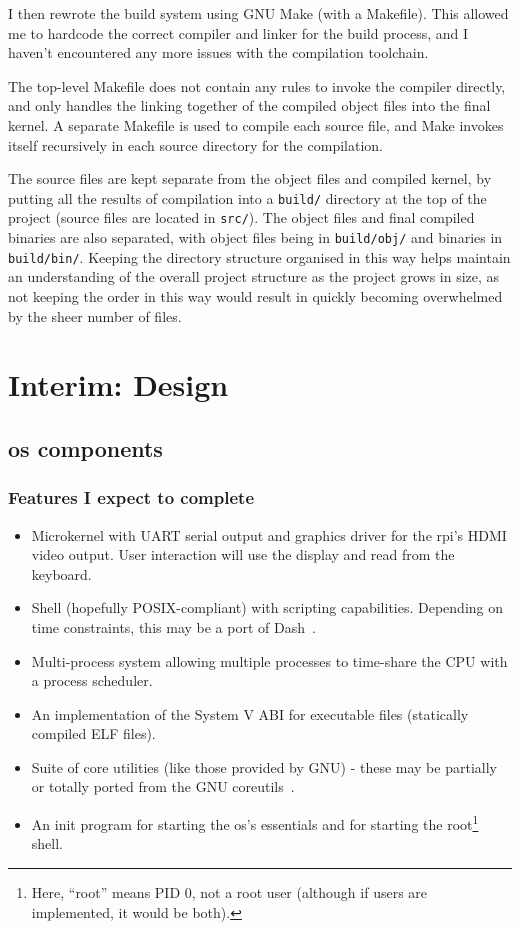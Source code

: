 \documentclass{article}
\begin{document}
I then rewrote the build system using GNU Make (with a Makefile). This allowed
me to hardcode the correct compiler and linker for the build process, and I
haven't encountered any more issues with the compilation toolchain.

The top-level Makefile does not contain any rules to invoke the compiler
directly, and only handles the linking together of the compiled object files
into the final kernel. A separate Makefile is used to compile each source file,
and Make invokes itself recursively in each source directory for the
compilation.

The source files are kept separate from the object files and compiled kernel,
by putting all the results of compilation into a \texttt{build/} directory at
the top of the project (source files are located in \texttt{src/}). The object
files and final compiled binaries are also separated, with object files being
in \texttt{build/obj/} and binaries in \texttt{build/bin/}. Keeping the
directory structure organised in this way helps maintain an understanding of
the overall project structure as the project grows in size, as not keeping the
order in this way would result in quickly becoming overwhelmed by the sheer
number of files.

\section{Interim: Design}
\subsection{\texorpdfstring{\gls{os}}{OS} components}
\subsubsection{Features I expect to complete}
\begin{itemize}
    \item Microkernel with UART serial output and graphics driver for the \gls{rpi}'s
        HDMI video output. User interaction will use the display and read from
        the keyboard.
    \item Shell (hopefully POSIX-compliant) with scripting capabilities.
        Depending on time constraints, this may be a port of
        Dash~\cite{dash-shell}.
    \item Multi-process system allowing multiple processes to time-share the
        CPU with a process scheduler.
    \item An implementation of the System V ABI for executable files
        (statically compiled ELF files).
    \item Suite of core utilities (like those provided by GNU) - these may be
        partially or totally ported from the GNU
        coreutils~\cite{gnu-coreutils}.
    \item An init program for starting the \gls{os}'s essentials and for starting the
        root\footnote{Here, ``root'' means PID 0, not a root user (although if
        users are implemented, it would be both).} shell.
\end{itemize}
\end{document}

